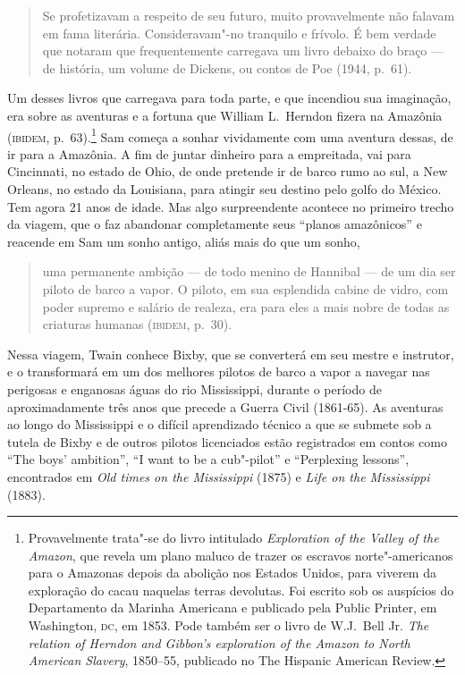\begin{quote}
Se profetizavam a respeito
de seu futuro, muito provavelmente não falavam em fama literária.
Consideravam"-no tranquilo e frívolo. É bem verdade que notaram que
frequentemente carregava um livro debaixo do braço --- de história, um
volume de Dickens, ou contos de Poe (1944, p.~61).
\end{quote}

Um desses livros que carregava para toda parte, e que incendiou sua
imaginação, era sobre as aventuras e a fortuna que William L.~Herndon
fizera na Amazônia (\textsc{ibidem}, p.~63).\footnote{ Provavelmente trata"-se do
livro intitulado \textit{Exploration of the Valley of the
Amazon}, que revela um plano maluco de trazer os escravos
norte"-americanos para o Amazonas depois da abolição nos
Estados Unidos, para viverem da exploração do cacau naquelas terras
devolutas. Foi escrito sob os auspícios do Departamento da Marinha
Americana e publicado pela Public Printer, em Washington, \textsc{dc}, em 1853.
Pode também ser o livro de W.J.~Bell Jr. \textit{The relation of Herndon
and Gibbon's exploration of the Amazon to North American Slavery},
1850--55, publicado no The Hispanic American Review.} Sam começa a
sonhar vividamente com uma aventura dessas, de ir para a Amazônia. A fim de
juntar dinheiro para a empreitada, vai para Cincinnati, no estado de
Ohio, de onde pretende ir de barco rumo ao sul, a New Orleans, no estado
da Louisiana, para atingir seu destino pelo golfo do México. Tem agora
21 anos de idade. Mas algo surpreendente acontece no primeiro
trecho da viagem, que o faz abandonar completamente seus
``planos amazônicos'' e reacende em Sam um sonho
antigo, aliás mais do que um sonho,

\begin{quote}
uma permanente ambição
--- de todo menino de Hannibal --- de um dia ser piloto de barco a vapor. O
piloto, em sua esplendida cabine de vidro, com poder supremo e salário de
realeza, era para eles a mais nobre de todas as criaturas
humanas (\textsc{ibidem}, p.~30).
\end{quote}

Nessa viagem, Twain conhece Bixby, que se converterá em seu mestre e
instrutor, e o transformará em um dos melhores pilotos de barco a vapor a
navegar nas perigosas e enganosas águas do rio Mississippi, durante o
período de aproximadamente três anos que precede a Guerra Civil
(1861-65). As aventuras ao longo do Mississippi e o difícil aprendizado
técnico a que se submete sob a tutela de Bixby e de outros pilotos
licenciados estão registrados em contos como ``The
boys' ambition'', ``I want to be a cub"-pilot'' e ``Perplexing
lessons'', encontrados em \textit{Old times on the Mississippi}
(1875) e \textit{Life on the Mississippi} (1883).

